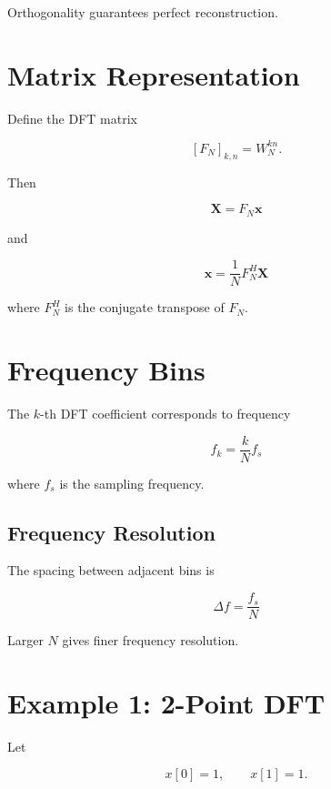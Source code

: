 Orthogonality guarantees perfect reconstruction.


\section{Matrix Representation}

Define the DFT matrix

\[
[F_N]_{k,n}=W_N^{kn}.
\]

Then

\[
\boxed{
\mathbf{X}=F_N\mathbf{x}
}
\]

and

\[
\boxed{
\mathbf{x}=\frac{1}{N}F_N^H\mathbf{X}
}
\]

where \(F_N^H\) is the conjugate transpose of \(F_N\).


\section{Frequency Bins}

The \(k\)-th DFT coefficient corresponds to frequency

\[
\boxed{
f_k=\frac{k}{N}f_s
}
\]

where \(f_s\) is the sampling frequency.


\subsection{Frequency Resolution}

The spacing between adjacent bins is

\[
\boxed{
\Delta f=\frac{f_s}{N}
}
\]

Larger \(N\) gives finer frequency resolution.


\section{Example 1: 2-Point DFT}

Let

\[
x[0]=1,\qquad x[1]=1.
\]

